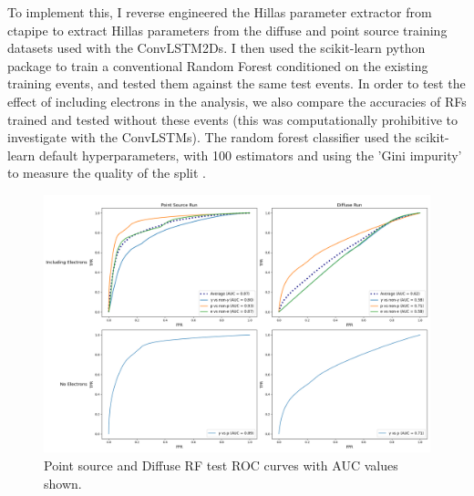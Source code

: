 To implement this, I reverse engineered the Hillas parameter extractor from ctapipe to extract Hillas parameters from the diffuse and point source training datasets used with the ConvLSTM2Ds. I then used the scikit-learn python package to train a conventional Random Forest conditioned on the existing training events, and tested them against the same test events. In order to test the effect of including electrons in the analysis, we also compare the accuracies of RFs trained and tested without these events (this was computationally prohibitive to investigate with the ConvLSTMs). The random forest classifier used the scikit-learn default hyperparameters, with 100 estimators and using the 'Gini impurity' to measure the quality of the split \cite{scikit}.

\begin{figure}[ht] 
        \centering \includegraphics[width=1.0\columnwidth]{figures/rfplot.png}

        \caption{
                \label{fig:rfplot} %
                Point source and Diffuse RF test ROC curves with AUC values shown.
        }
\end{figure}

